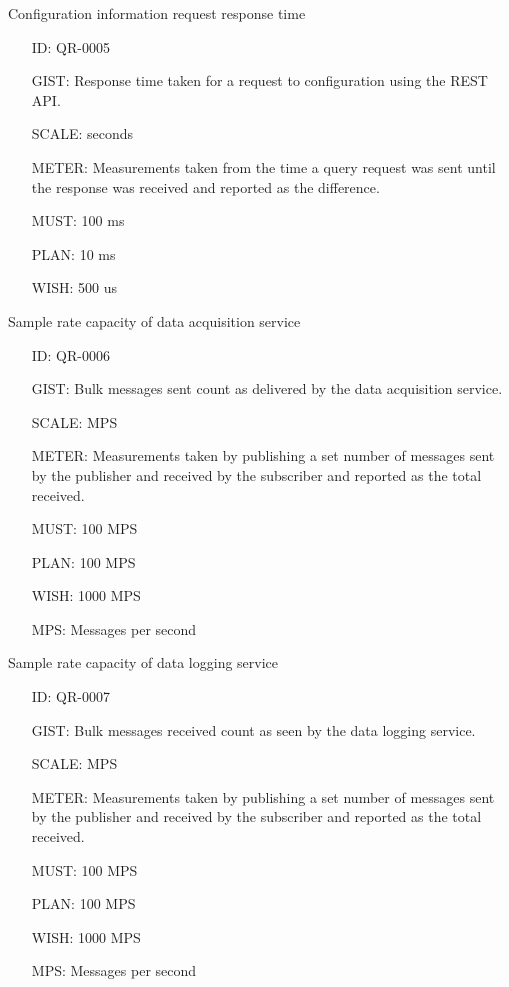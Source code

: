         Configuration information request response time

        \begin{itemize}
          \setlength{\itemindent}{.5in}
          \itemsep .15em
          \item[ID:] QR-0005
          \item[GIST:] Response time taken for a request to configuration
            using the REST API.
          \item[SCALE:] seconds
          \item[METER:] Measurements taken from the time a query request was
            sent until the response was received and reported as the difference.
          \item[MUST:] 100 ms
          \item[PLAN:] 10 ms
          \item[WISH:] 500 us
        \end{itemize}

        Sample rate capacity of data acquisition service

        \begin{itemize}
          \setlength{\itemindent}{.5in}
          \itemsep .15em
          \item[ID:] QR-0006
          \item[GIST:] Bulk messages sent count as delivered by the data
            acquisition service.
          \item[SCALE:] MPS
          \item[METER:] Measurements taken by publishing a set number of
            messages sent by the publisher and received by the subscriber and
            reported as the total received.
          \item[MUST:] 100 MPS
          \item[PLAN:] 100 MPS
          \item[WISH:] 1000 MPS
          \item[MPS:] Messages per second
        \end{itemize}

        Sample rate capacity of data logging service

        \begin{itemize}
          \setlength{\itemindent}{.5in}
          \itemsep .15em
          \item[ID:] QR-0007
          \item[GIST:] Bulk messages received count as seen by the data logging
            service.
          \item[SCALE:] MPS
          \item[METER:] Measurements taken by publishing a set number of
            messages sent by the publisher and received by the subscriber and
            reported as the total received.
          \item[MUST:] 100 MPS
          \item[PLAN:] 100 MPS
          \item[WISH:] 1000 MPS
          \item[MPS:] Messages per second
        \end{itemize}

